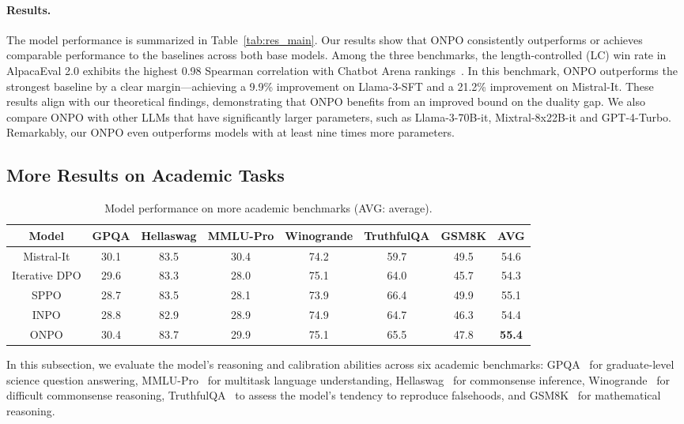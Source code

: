 \paragraph{Results.} The model performance is summarized in Table~\ref{tab:res_main}. Our results show that ONPO consistently outperforms or achieves comparable performance to the baselines across both base models. Among the three benchmarks, the length-controlled (LC) win rate in AlpacaEval 2.0 exhibits the highest 0.98 Spearman correlation with Chatbot Arena rankings~\citep{dubois2024length}. In this benchmark, ONPO outperforms the strongest baseline by a clear margin—achieving a 9.9\% improvement on Llama-3-SFT and a 21.2\% improvement on Mistral-It. These results align with our theoretical findings, demonstrating that ONPO benefits from an improved bound on the duality gap. We also compare ONPO with other LLMs that have significantly larger parameters, such as Llama-3-70B-it, Mixtral-8x22B-it and GPT-4-Turbo. Remarkably, our ONPO even outperforms models with at least nine times more parameters.

\subsection{More Results on Academic Tasks}
\begin{table*}[ht]
    \centering
    \caption{Model performance on more academic benchmarks (AVG: average).}\label{tab:academic}
    \vspace{5pt}
    \begin{tabular}{c|c|c|c|c|c|c|c}
    \toprule
    \textbf{Model} & \textbf{GPQA} & \textbf{Hellaswag} & \textbf{MMLU-Pro} & \textbf{Winogrande} & \textbf{TruthfulQA} & \textbf{GSM8K} &\textbf{AVG} \\ \midrule
    Mistral-It & 30.1 & 83.5 & 30.4 & 74.2 & 59.7 & 49.5 & 54.6 \\ 
    Iterative DPO & 29.6 & 83.3 & 28.0 & 75.1 & 64.0 & 45.7 & 54.3 \\ 
    SPPO & 28.7 & 83.5 & 28.1 & 73.9 & 66.4 & 49.9 & 55.1 \\
    INPO & 28.8 & 82.9 & 28.9 & 74.9 & 64.7 & 46.3 & 54.4  \\
    ONPO & 30.4 & 83.7 & 29.9 & 75.1 & 65.5 & 47.8 & \textbf{55.4}  \\
    \bottomrule
    \end{tabular}
\end{table*}
In this subsection, we evaluate the model’s reasoning and calibration abilities across six academic benchmarks: GPQA~\citep{rein2023gpqa} for graduate-level science question answering, MMLU-Pro~\citep{wang2024mmlu} for multitask language understanding, Hellaswag~\citep{zellers2019hellaswag} for commonsense inference, Winogrande~\citep{sakaguchi2021winogrande} for difficult commonsense reasoning, TruthfulQA~\citep{lin2021truthfulqa} to assess the model’s tendency to reproduce falsehoods, and GSM8K~\citep{cobbe2021training} for mathematical reasoning.

